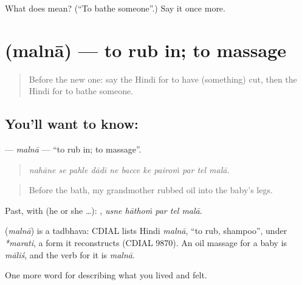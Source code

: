 \begin{tcolorbox}[breakable,colback=teal!4,colframe=teal!35!black,title={Before you move on}]
What does  mean? (\textquotedblleft{}To bathe someone\textquotedblright{}.) Say it once more.
\end{tcolorbox}
\section[\texorpdfstring{\hi{मलना} (malnā)}{मलना (malnā)}]{ (malnā) — to rub in; to massage}

\label{lesson:HI-C484-malna}



\begin{quote}
Before the new one: say the Hindi for to have (something) cut, then the Hindi for to bathe someone.
\end{quote}

\subsection*{You'll want to know: }
\textbf{} — \emph{malnā} — \textquotedblleft{}to rub in; to massage\textquotedblright{}.

\begin{quote}
          
\end{quote}

\begin{quote}
\emph{nahāne se pahle dādī ne bacce ke pairoṁ par tel malā.}
\end{quote}

\begin{quote}
Before the bath, my grandmother rubbed oil into the baby's legs.
\end{quote}

Past, with  (he or she …):     , \emph{usne hāthoṁ par tel malā}.

\begin{cousinweb}
\textbf{} (\emph{malnā}) is a tadbhava: CDIAL lists Hindi \emph{malnā}, \textquotedblleft{}to rub, shampoo\textquotedblright{}, under \emph{*marati}, a form it reconstructs (CDIAL 9870). An oil massage for a baby is \emph{māliś}, and the verb for it is \emph{malnā}.
\end{cousinweb}

\begin{grammarlens}[title={What you've built}]
One more word for describing what you lived and felt.
\end{grammarlens}

